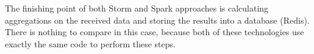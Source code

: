 The finishing point of both Storm and Spark approaches is calculating aggregations on the received data and storing the results into a database (Redis).
There is nothing to compare in this case, because both of these technologies use exactly the same code to perform these steps.



